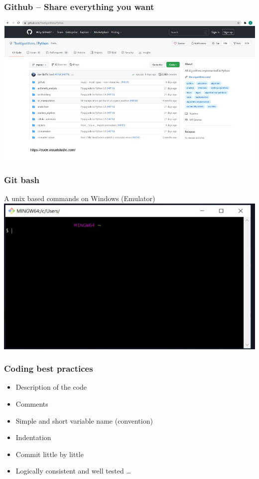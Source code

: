 \documentclass{beamer}
\begin{document}
\begin{frame}
    \frametitle{Github – Share everything you want}
    \centering
    \includegraphics[scale = 0.5]{figures/github.jpg}
\end{frame}

\begin{frame}
    \frametitle{Git bash}
    A unix based commands on Windows (Emulator)
    \centering
    \includegraphics[scale = 0.5]{figures/git_bash.jpg}
\end{frame}

\begin{frame}
    \frametitle{Coding best practices}
    \begin{itemize}
        \item Description of the code
        \item Comments
        \item Simple and short variable name (convention)
        \item Indentation
        \item Commit little by little
        \item Logically consistent and well tested … 
    \end{itemize}
\end{frame}
\end{document}
